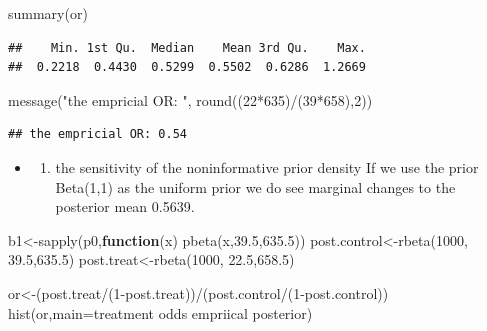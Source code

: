 \documentclass[
]{book}
\newenvironment{Shaded}{\begin{snugshade}}{\end{snugshade}}
\newcommand{\AttributeTok}[1]{\textcolor[rgb]{0.77,0.63,0.00}{#1}}
\newcommand{\ControlFlowTok}[1]{\textcolor[rgb]{0.13,0.29,0.53}{\textbf{#1}}}
\newcommand{\DecValTok}[1]{\textcolor[rgb]{0.00,0.00,0.81}{#1}}
\newcommand{\FloatTok}[1]{\textcolor[rgb]{0.00,0.00,0.81}{#1}}
\newcommand{\FunctionTok}[1]{\textcolor[rgb]{0.00,0.00,0.00}{#1}}
\newcommand{\NormalTok}[1]{#1}
\newcommand{\OtherTok}[1]{\textcolor[rgb]{0.56,0.35,0.01}{#1}}
\newcommand{\SpecialCharTok}[1]{\textcolor[rgb]{0.00,0.00,0.00}{#1}}
\newcommand{\StringTok}[1]{\textcolor[rgb]{0.31,0.60,0.02}{#1}}
\providecommand{\tightlist}{%
  \setlength{\itemsep}{0pt}\setlength{\parskip}{0pt}}
\theoremstyle{definition}
\theoremstyle{definition}
\theoremstyle{definition}
\theoremstyle{definition}
\theoremstyle{remark}
\begin{document}
\begin{Shaded}
\begin{Highlighting}[]
  \FunctionTok{summary}\NormalTok{(or)}
\end{Highlighting}
\end{Shaded}

\begin{verbatim}
##    Min. 1st Qu.  Median    Mean 3rd Qu.    Max. 
##  0.2218  0.4430  0.5299  0.5502  0.6286  1.2669
\end{verbatim}

\begin{Shaded}
\begin{Highlighting}[]
  \FunctionTok{message}\NormalTok{(}\StringTok{"the empricial OR: "}\NormalTok{, }\FunctionTok{round}\NormalTok{((}\DecValTok{22}\SpecialCharTok{*}\DecValTok{635}\NormalTok{)}\SpecialCharTok{/}\NormalTok{(}\DecValTok{39}\SpecialCharTok{*}\DecValTok{658}\NormalTok{),}\DecValTok{2}\NormalTok{))}
\end{Highlighting}
\end{Shaded}

\begin{verbatim}
## the empricial OR: 0.54
\end{verbatim}

\begin{itemize}
\item
  \begin{enumerate}
  \def\labelenumi{(\alph{enumi})}
  \setcounter{enumi}{2}
  \tightlist
  \item
    the sensitivity of the noninformative prior density
    If we use the prior Beta(1,1) as the uniform prior we do see marginal changes to the posterior mean 0.5639.
  \end{enumerate}
\end{itemize}

\begin{Shaded}
\begin{Highlighting}[]
\NormalTok{b1}\OtherTok{\textless{}{-}}\FunctionTok{sapply}\NormalTok{(p0,}\ControlFlowTok{function}\NormalTok{(x) }\FunctionTok{pbeta}\NormalTok{(x,}\FloatTok{39.5}\NormalTok{,}\FloatTok{635.5}\NormalTok{))}
\NormalTok{ post.control}\OtherTok{\textless{}{-}}\FunctionTok{rbeta}\NormalTok{(}\DecValTok{1000}\NormalTok{, }\FloatTok{39.5}\NormalTok{,}\FloatTok{635.5}\NormalTok{)}
\NormalTok{  post.treat}\OtherTok{\textless{}{-}}\FunctionTok{rbeta}\NormalTok{(}\DecValTok{1000}\NormalTok{, }\FloatTok{22.5}\NormalTok{,}\FloatTok{658.5}\NormalTok{)}

\NormalTok{  or}\OtherTok{\textless{}{-}}\NormalTok{(post.treat}\SpecialCharTok{/}\NormalTok{(}\DecValTok{1}\SpecialCharTok{{-}}\NormalTok{post.treat))}\SpecialCharTok{/}\NormalTok{(post.control}\SpecialCharTok{/}\NormalTok{(}\DecValTok{1}\SpecialCharTok{{-}}\NormalTok{post.control))}
  \FunctionTok{hist}\NormalTok{(or,}\AttributeTok{main=}\StringTok{\textquotesingle{}treatment odds empriical posterior\textquotesingle{}}\NormalTok{)}
\end{Highlighting}
\end{Shaded}
\end{document}
